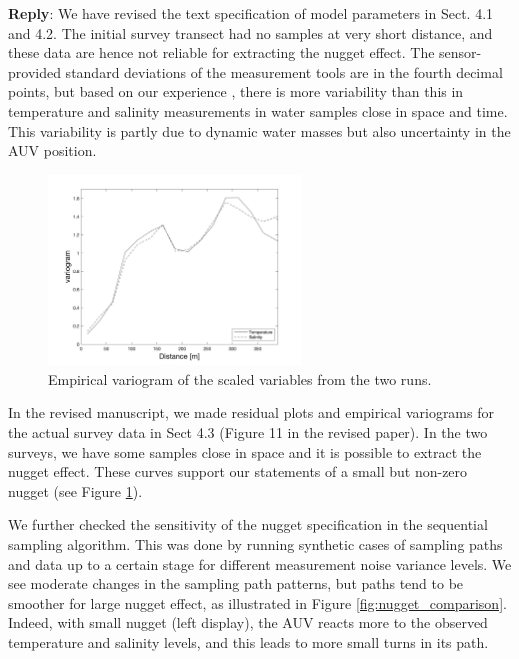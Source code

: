 \documentclass[a4paper]{article}
\def\reply{\textbf{Reply}}
\begin{document}
\vspace{5mm}
\reply: We have revised the text specification of model parameters in Sect. 4.1 and 4.2. The initial survey transect had no samples at very short distance, and these data are hence not reliable for extracting the nugget effect. The sensor-provided standard deviations of the measurement tools are in the fourth decimal points, but based on our experience \citep{fossuminformation}, there is more variability than this in temperature and salinity measurements in water samples close in space and time. This variability is partly due to dynamic water masses but also uncertainty in the AUV position. 
\begin{figure}[h] 
\centering
\includegraphics[width=0.6\textwidth]{Figures/field-trials/empVAR.png}
\caption{Empirical variogram of the scaled variables from the two runs. }
\label{empVar}
\end{figure}

In the revised manuscript, we made residual plots and empirical variograms for the actual survey data in Sect 4.3 (Figure 11 in the revised paper). In the two surveys, we have some samples close in space and it is possible to extract the nugget effect. These curves support our statements of a small but non-zero nugget (see Figure \ref{empVar}).


We further checked the sensitivity of the nugget specification in the sequential sampling algorithm. This was done by running synthetic cases of sampling paths and data up to a certain stage for different measurement noise variance levels. We see moderate changes in the sampling path patterns, but paths tend to be smoother for large nugget effect, as illustrated in Figure \ref{fig:nugget_comparison}.
Indeed, with small nugget (left display), the AUV reacts more to the observed temperature and salinity levels, and this leads to more small turns in its path.
\end{document}
